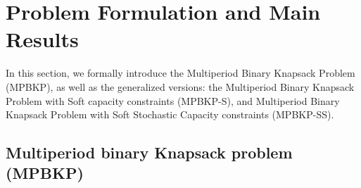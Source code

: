 \documentclass[11pt]{article}
\begin{document}
%	
	
\section{Problem Formulation and Main Results}\label{sec:form}
In this section, we formally introduce the Multiperiod Binary Knapsack Problem (MPBKP), as well as the generalized versions: the Multiperiod Binary Knapsack Problem with Soft capacity constraints (MPBKP-S), {  and Multiperiod Binary Knapsack Problem with Soft Stochastic Capacity constraints (MPBKP-SS)}.


\subsection{Multiperiod binary Knapsack problem (MPBKP)}
\end{document}
